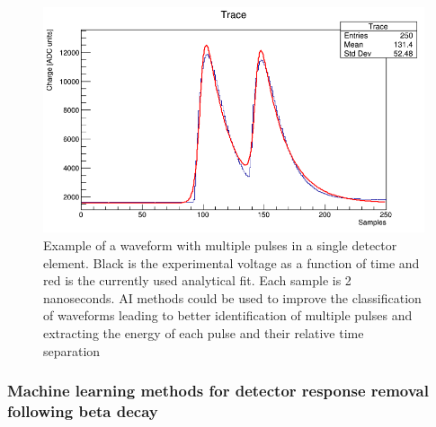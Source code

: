 \documentclass[%
10pt]{article}
\begin{document}
\begin{figure}[htb!]
\centering
\includegraphics[width=0.6\linewidth]{figures/DoubleTrace.png}
\caption{Example  of  a  waveform  with  multiple  pulses  in  a single detector element.  Black is the experimental voltage as a  function  of  time  and  red  is  the  currently  used  analytical fit.  Each sample is 2 nanoseconds.  AI methods could be used to  improve  the  classification  of  waveforms  leading  to  better identification of multiple pulses and extracting the energy of each pulse and their relative time separation
}
\end{figure}
\clearpage
\newpage

\subsubsection{Machine learning methods for detector response removal following beta decay }
\end{document}
